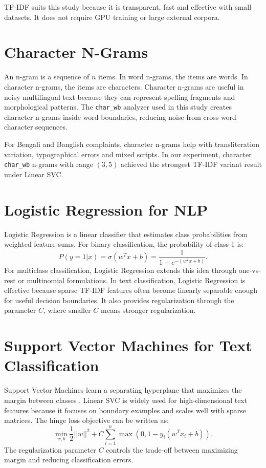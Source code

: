 \documentclass[12pt,a4paper,openany]{book}
\begin{document}
TF-IDF suits this study because it is transparent, fast and effective with small datasets. It does not require GPU training or large external corpora.

\section{Character N-Grams}
An n-gram is a sequence of $n$ items. In word n-grams, the items are words. In character n-grams, the items are characters. Character n-grams are useful in noisy multilingual text because they can represent spelling fragments and morphological patterns. The \texttt{char\_wb} analyzer used in this study creates character n-grams inside word boundaries, reducing noise from cross-word character sequences.

For Bengali and Banglish complaints, character n-grams help with transliteration variation, typographical errors and mixed scripts. In our experiment, character \texttt{char\_wb} n-grams with range $(3,5)$ achieved the strongest TF-IDF variant result under Linear SVC.

\section{Logistic Regression for NLP}
Logistic Regression is a linear classifier that estimates class probabilities from weighted feature sums. For binary classification, the probability of class 1 is:
\begin{equation}
P(y=1|x)=\sigma(w^Tx+b)=\frac{1}{1+e^{-(w^Tx+b)}}.
\end{equation}
For multiclass classification, Logistic Regression extends this idea through one-vs-rest or multinomial formulations. In text classification, Logistic Regression is effective because sparse TF-IDF features often become linearly separable enough for useful decision boundaries. It also provides regularization through the parameter $C$, where smaller $C$ means stronger regularization.

\section{Support Vector Machines for Text Classification}
Support Vector Machines learn a separating hyperplane that maximizes the margin between classes \cite{cortes1995support}. Linear SVC is widely used for high-dimensional text features because it focuses on boundary examples and scales well with sparse matrices. The hinge loss objective can be written as:
\begin{equation}
\min_{w,b} \frac{1}{2}||w||^2 + C\sum_{i=1}^{n}\max(0,1-y_i(w^Tx_i+b)).
\end{equation}
The regularization parameter $C$ controls the trade-off between maximizing margin and reducing classification errors.
\end{document}
